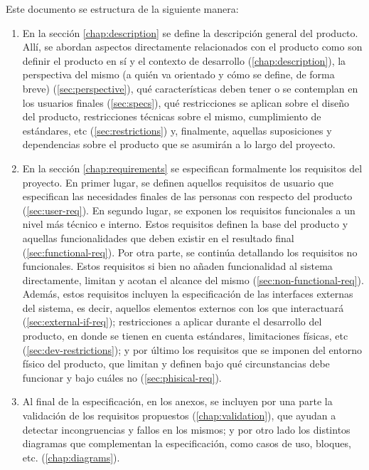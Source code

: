 Este documento se estructura de la siguiente manera:

\begin{enumerate}
  \item En la sección \ref{chap:description} se define la descripción general del
        producto. Allí, se abordan aspectos directamente relacionados con el producto
        como son definir el producto en sí y el contexto de desarrollo (\ref{chap:description}),
        la perspectiva del mismo (a quién va orientado y cómo se define, de forma breve)
        (\ref{sec:perspective}), qué características deben tener o se contemplan en
        los usuarios finales (\ref{sec:specs}), qué restricciones se aplican sobre
        el diseño del producto, restricciones técnicas sobre el mismo, cumplimiento de estándares,
        etc (\ref{sec:restrictions}) y, finalmente, aquellas suposiciones y dependencias
        sobre el producto que se asumirán a lo largo del proyecto.
  \item En la sección \ref{chap:requirements} se especifican formalmente los
        requisitos del proyecto. En primer lugar, se definen aquellos requisitos
        de usuario que especifican las necesidades finales de las personas con respecto
        del producto (\ref{sec:user-req}). En segundo lugar, se exponen los requisitos
        funcionales a un nivel más técnico e interno. Estos requisitos definen la
        base del producto y aquellas funcionalidades que deben existir en el resultado
        final (\ref{sec:functional-req}). Por otra parte, se continúa detallando
        los requisitos no funcionales. Estos requisitos si bien no añaden funcionalidad
        al sistema directamente, limitan y acotan el alcance del mismo (\ref{sec:non-functional-req}).
        Además, estos requisitos incluyen la especificación de las interfaces externas
        del sistema, es decir, aquellos elementos externos con los que interactuará
        (\ref{sec:external-if-req}); restricciones a aplicar durante el desarrollo del
        producto, en donde se tienen en cuenta estándares, limitaciones físicas, etc
        (\ref{sec:dev-restrictions}); y por último los requisitos que se imponen del
        entorno físico del producto, que limitan y definen bajo qué circunstancias
        debe funcionar y bajo cuáles no (\ref{sec:phisical-req}).
  \item Al final de la especificación, en los anexos, se incluyen por una parte
        la validación de los requisitos propuestos (\ref{chap:validation}), que 
        ayudan a detectar incongruencias y fallos en los mismos; y por otro lado
        los distintos diagramas que complementan la especificación,
        como casos de uso, bloques, etc. (\ref{chap:diagrams}).
\end{enumerate}